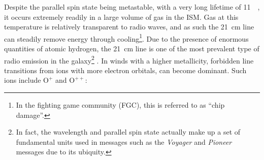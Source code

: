 \noindent
Despite the parallel spin state being metastable, with a very long lifetime of \SI{11}{\mega\year}, it occurs extremely readily in a large volume of gas in the ISM.
Gas at this temperature is relatively transparent to radio waves, and as such the \SI{21}{cm} line can steadily remove energy through cooling\footnote{In the fighting game community (FGC), this is referred to as ``chip damage''.}.
Due to the presence of enormous quantities of atomic hydrogen, the \SI{21}{\centi\metre} line is one of the most prevalent type of radio emission in the galaxy\footnote{In fact, the wavelength and parallel spin state actually make up a set of fundamental units used in messages such as the \textit{Voyager} and \textit{Pioneer} messages due to its ubiquity.}
\parencite[Ch.~8]{drainePhysicsInterstellarIntergalactic2011}.
In winds with a higher metallicity, forbidden line transitions from ions with more electron orbitals, can become dominant.
Such ions include $\text{O}^+$ and $\text{O}^{++}$:

